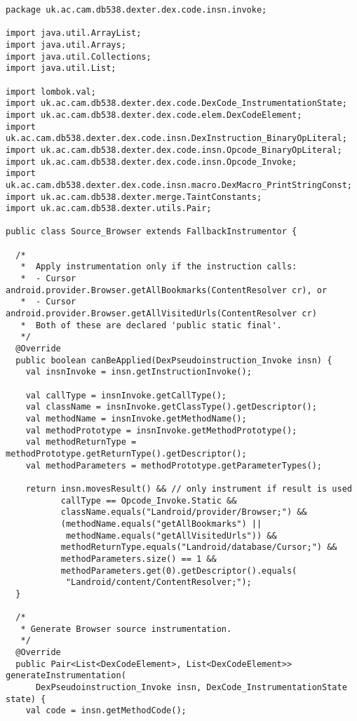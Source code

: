 \begin{lstlisting}
package uk.ac.cam.db538.dexter.dex.code.insn.invoke;

import java.util.ArrayList;
import java.util.Arrays;
import java.util.Collections;
import java.util.List;

import lombok.val;
import uk.ac.cam.db538.dexter.dex.code.DexCode_InstrumentationState;
import uk.ac.cam.db538.dexter.dex.code.elem.DexCodeElement;
import uk.ac.cam.db538.dexter.dex.code.insn.DexInstruction_BinaryOpLiteral;
import uk.ac.cam.db538.dexter.dex.code.insn.Opcode_BinaryOpLiteral;
import uk.ac.cam.db538.dexter.dex.code.insn.Opcode_Invoke;
import uk.ac.cam.db538.dexter.dex.code.insn.macro.DexMacro_PrintStringConst;
import uk.ac.cam.db538.dexter.merge.TaintConstants;
import uk.ac.cam.db538.dexter.utils.Pair;

public class Source_Browser extends FallbackInstrumentor {

  /*
   *  Apply instrumentation only if the instruction calls:
   *  - Cursor android.provider.Browser.getAllBookmarks(ContentResolver cr), or
   *  - Cursor android.provider.Browser.getAllVisitedUrls(ContentResolver cr)
   *  Both of these are declared 'public static final'.
   */
  @Override
  public boolean canBeApplied(DexPseudoinstruction_Invoke insn) {
    val insnInvoke = insn.getInstructionInvoke();

    val callType = insnInvoke.getCallType();
    val className = insnInvoke.getClassType().getDescriptor();
    val methodName = insnInvoke.getMethodName();
    val methodPrototype = insnInvoke.getMethodPrototype();
    val methodReturnType = methodPrototype.getReturnType().getDescriptor();
    val methodParameters = methodPrototype.getParameterTypes();

    return insn.movesResult() && // only instrument if result is used
           callType == Opcode_Invoke.Static &&
           className.equals("Landroid/provider/Browser;") &&
           (methodName.equals("getAllBookmarks") || 
           	methodName.equals("getAllVisitedUrls")) &&
           methodReturnType.equals("Landroid/database/Cursor;") &&
           methodParameters.size() == 1 &&
           methodParameters.get(0).getDescriptor().equals(
           	"Landroid/content/ContentResolver;");
  }

  /*
   * Generate Browser source instrumentation.
   */
  @Override
  public Pair<List<DexCodeElement>, List<DexCodeElement>> generateInstrumentation(
      DexPseudoinstruction_Invoke insn, DexCode_InstrumentationState state) {
    val code = insn.getMethodCode();


\end{lstlisting}
